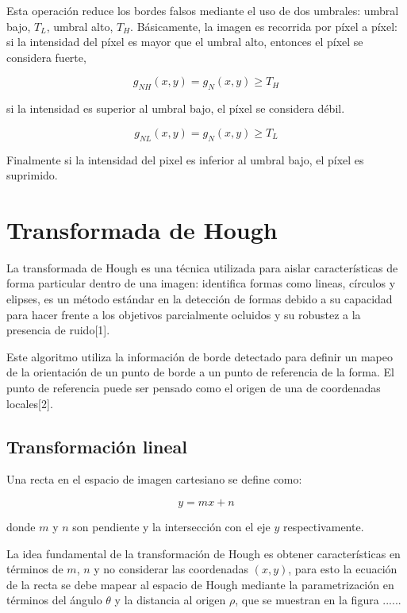 Esta operación reduce los bordes falsos mediante el uso de dos umbrales: umbral bajo, $T_L$, umbral alto, $T_H$. Básicamente, la imagen es recorrida por píxel a píxel: si la intensidad del píxel es mayor que el umbral alto, entonces el píxel se considera fuerte,

\begin{equation}
g_{NH}(x,y) = g_{N}(x,y)\geq T_H
\end{equation}

si la intensidad es superior al umbral bajo, el píxel se considera débil.  

\begin{equation}
g_{NL}(x,y) = g_{N}(x,y)\geq T_L
\end{equation}

Finalmente si la intensidad del pixel es inferior al umbral bajo, el píxel es suprimido.

\section{Transformada de Hough}


La transformada de Hough es una técnica utilizada para aislar características de forma particular dentro de una imagen: identifica formas como lineas, círculos y elipses, es un método estándar en la detección de formas debido a su capacidad para hacer frente a los objetivos parcialmente ocluidos y su robustez a la presencia de ruido[1].

Este algoritmo utiliza la información de borde detectado para definir un mapeo de la orientación de un punto de borde a un punto de referencia de la forma. El punto de referencia puede ser pensado como el origen de una de coordenadas locales[2].

\subsection{Transformación lineal}

Una recta en el espacio de imagen cartesiano se define como:

\begin{equation}
y=mx+n
\end{equation}

donde $m$ y $n$ son pendiente y la intersección con el eje $y$ respectivamente. 

La idea fundamental de la transformación de Hough es obtener características en términos de $m$, $n$ y no considerar las coordenadas $(x,y)$, para esto la ecuación de la recta se debe mapear al espacio de Hough mediante la parametrización en términos del ángulo $\theta$ y la distancia al origen $\rho$, que se muestran en la figura ......%



